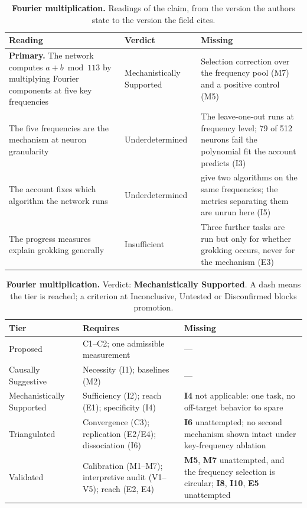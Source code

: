 \clearpage
\begin{table}[H]
\centering
\footnotesize
\caption{\textbf{Fourier multiplication.} Readings of the claim, from the version the authors state to the version the
field cites.}
\label{tab:grokking-readings}
\renewcommand{\arraystretch}{1.18}
\begin{tabular}{@{}>{\raggedright\arraybackslash}p{3.3cm}l>{\raggedright\arraybackslash}p{4.4cm}@{}}
\toprule
\textbf{Reading} & \textbf{Verdict} & \textbf{Missing} \\
\midrule
\textbf{Primary.} The network computes $a+b \bmod 113$ by multiplying Fourier components at five key frequencies
  & Mechanistically Supported
  & Selection correction over the frequency pool (M7) and a positive control (M5) \\
\addlinespace[2pt]
The five frequencies are the mechanism at neuron granularity
  & Underdetermined
  & The leave-one-out runs at frequency level; 79 of 512 neurons fail the polynomial fit the account predicts (I3) \\
\addlinespace[2pt]
The account fixes which algorithm the network runs
  & Underdetermined
  & \citet{zhong2023clock} give two algorithms on the same frequencies; the metrics separating them are unrun here (I5) \\
\addlinespace[2pt]
The progress measures explain grokking generally
  & Insufficient
  & Three further tasks are run but only for whether grokking occurs, never for the mechanism (E3) \\
\bottomrule
\end{tabular}
\end{table}

\begin{table}[H]
\centering
\footnotesize
\caption{\textbf{Fourier multiplication.} Verdict: \textbf{Mechanistically Supported}. A dash means the tier is reached; a criterion at
Inconclusive, Untested or Disconfirmed blocks promotion.}
\label{tab:grokking-verdict}
\renewcommand{\arraystretch}{1.18}
\begin{tabular}{@{}l>{\raggedright\arraybackslash}p{3.6cm}>{\raggedright\arraybackslash}p{4.4cm}@{}}
\toprule
\textbf{Tier} & \textbf{Requires} & \textbf{Missing} \\
\midrule
Proposed & C1--C2; one admissible measurement & --- \\
\addlinespace[2pt]
Causally Suggestive & Necessity (I1); baselines (M2) & --- \\
\addlinespace[2pt]
Mechanistically Supported & Sufficiency (I2); reach (E1); specificity (I4) & \textbf{I4} not applicable: one task, no off-target behavior to spare \\
\addlinespace[2pt]
Triangulated & Convergence (C3); replication (E2/E4); dissociation (I6) & \textbf{I6} unattempted; no second mechanism shown intact under key-frequency ablation \\
\addlinespace[2pt]
Validated & Calibration (M1--M7); interpretive audit (V1--V5); reach (E2, E4) & \textbf{M5}, \textbf{M7} unattempted, and the frequency selection is circular; \textbf{I8}, \textbf{I10}, \textbf{E5} unattempted \\
\bottomrule
\end{tabular}
\end{table}
